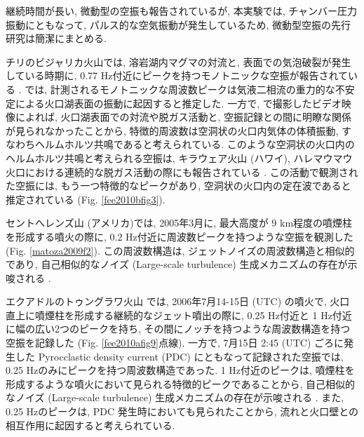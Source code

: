 \documentclass[12pt]{article}
\begin{document}
継続時間が長い, 微動型の空振も報告されているが, 本実験では, チャンバー圧力振動にともなって, パルス的な空気振動が発生しているため, 微動型空振の先行研究は簡潔にまとめる. 

チリのビジャリカ火山では, 溶岩湖内マグマの対流と, 表面での気泡破裂が発生している時期に, 0.77 Hz付近にピークを持つモノトニックな空振が報告されている \citep{Ripepe2010b, Goto2011}. 
\cite{Ripepe2010b}では, 計測されるモノトニックな周波数ピークは気液二相流の重力的な不安定による火口湖表面の振動に起因すると推定した. %
一方で, \cite{Goto2011}で撮影したビデオ映像によれば, 火口湖表面での対流や脱ガス活動と, 空振記録との間に明瞭な関係が見られなかったことから, 特徴的周波数は空洞状の火口内気体の体積振動, すなわちヘルムホルツ共鳴であると考えられている. %
このような空洞状の火口内のヘルムホルツ共鳴と考えられる空振は, キラウェア火山 (ハワイ), ハレマウマウ火口における連続的な脱ガス活動の際にも報告されている \cite{Fee2010c}. 
この活動で観測された空振には, もう一つ特徴的なピークがあり, 空洞状の火口内の定在波であると推定されている (Fig. \ref{fee2010bfig3}). 

セントへレンズ山 (アメリカ)では, 2005年3月に, 最大高度が 9 km程度の噴煙柱を形成する噴火の際に, 0.2 Hz付近に周波数ピークを持つような空振を観測した (Fig. \ref{matoza2009f2}). 
この周波数構造は, ジェットノイズの周波数構造と相似的であり, 自己相似的なノイズ (Large-scale turbulence) 生成メカニズムの存在が示唆される \citep{Matoza2009a}.

エクアドルのトゥングラワ火山 \citep{Fee2010} では, 2006年7月14-15日 (UTC) の噴火で, 火口直上に噴煙柱を形成する継続的なジェット噴出の際に, 0.25 Hz付近と 1 Hz付近に幅の広い2つのピークを持ち, その間にノッチを持つような周波数構造を持つ空振を記録した (Fig. \ref{fee2010afig9}点線). 一方で, 7月15日 2:45 (UTC) ごろに発生した Pyrocclastic density current (PDC) にともなって記録された空振では, 0.25 Hzのみにピークを持つ周波数構造であった. 1 Hz付近のピークは, 噴煙柱を形成するような噴火において見られる特徴的ピークであることから, 自己相似的なノイズ (Large-scale turbulence) 生成メカニズムの存在が示唆される \citep{Matoza2009a}. また, 0.25 Hzのピークは, PDC 発生時においても見られたことから, 流れと火口壁との相互作用に起因すると考えられている.
\end{document}
